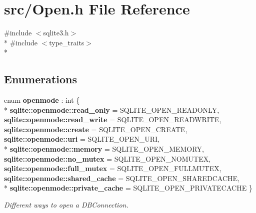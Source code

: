 \hypertarget{a00028}{\section{src/\-Open.h File Reference}
\label{a00028}
}
{\ttfamily \#include $<$sqlite3.\-h$>$}\\*
{\ttfamily \#include $<$type\-\_\-traits$>$}\\*
\subsection*{Enumerations}
\begin{DoxyCompactItemize}
\item 
enum {\bfseries openmode} \-: int \{ \\*
{\bfseries sqlite\-::openmode\-::read\-\_\-only} = S\-Q\-L\-I\-T\-E\-\_\-\-O\-P\-E\-N\-\_\-\-R\-E\-A\-D\-O\-N\-L\-Y, 
{\bfseries sqlite\-::openmode\-::read\-\_\-write} = S\-Q\-L\-I\-T\-E\-\_\-\-O\-P\-E\-N\-\_\-\-R\-E\-A\-D\-W\-R\-I\-T\-E, 
{\bfseries sqlite\-::openmode\-::create} = S\-Q\-L\-I\-T\-E\-\_\-\-O\-P\-E\-N\-\_\-\-C\-R\-E\-A\-T\-E, 
{\bfseries sqlite\-::openmode\-::uri} = S\-Q\-L\-I\-T\-E\-\_\-\-O\-P\-E\-N\-\_\-\-U\-R\-I, 
\\*
{\bfseries sqlite\-::openmode\-::memory} = S\-Q\-L\-I\-T\-E\-\_\-\-O\-P\-E\-N\-\_\-\-M\-E\-M\-O\-R\-Y, 
{\bfseries sqlite\-::openmode\-::no\-\_\-mutex} = S\-Q\-L\-I\-T\-E\-\_\-\-O\-P\-E\-N\-\_\-\-N\-O\-M\-U\-T\-E\-X, 
{\bfseries sqlite\-::openmode\-::full\-\_\-mutex} = S\-Q\-L\-I\-T\-E\-\_\-\-O\-P\-E\-N\-\_\-\-F\-U\-L\-L\-M\-U\-T\-E\-X, 
{\bfseries sqlite\-::openmode\-::shared\-\_\-cache} = S\-Q\-L\-I\-T\-E\-\_\-\-O\-P\-E\-N\-\_\-\-S\-H\-A\-R\-E\-D\-C\-A\-C\-H\-E, 
\\*
{\bfseries sqlite\-::openmode\-::private\-\_\-cache} = S\-Q\-L\-I\-T\-E\-\_\-\-O\-P\-E\-N\-\_\-\-P\-R\-I\-V\-A\-T\-E\-C\-A\-C\-H\-E
 \}
\begin{DoxyCompactList}\small\item\em Different ways to open a D\-B\-Connection. \end{DoxyCompactList}\end{DoxyCompactItemize}
